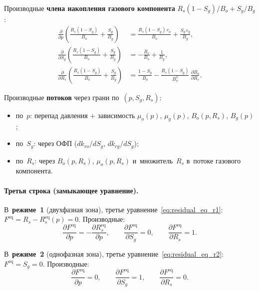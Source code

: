 \documentclass[12pt,a4paper]{article}
\begin{document}
Производные \textbf{члена накопления газового компонента}
$R_s(1-S_g)/B_o + S_g/B_g$:
\begin{align}
  \frac{\partial}{\partial p}\!\left(\frac{R_s(1\!-\!S_g)}{B_o}
    \!+\! \frac{S_g}{B_g}\right)
    &= \frac{R_s(1\!-\!S_g)\,c_o}{B_o}
       + \frac{S_g\,c_g}{B_g},
     \label{eq:daccum_gas_dp} \\[4pt]
  \frac{\partial}{\partial S_g}\!\left(\frac{R_s(1\!-\!S_g)}{B_o}
    \!+\! \frac{S_g}{B_g}\right)
    &= -\frac{R_s}{B_o} + \frac{1}{B_g},
     \label{eq:daccum_gas_dSg} \\[4pt]
  \frac{\partial}{\partial R_s}\!\left(\frac{R_s(1\!-\!S_g)}{B_o}
    \!+\! \frac{S_g}{B_g}\right)
    &= \frac{1\!-\!S_g}{B_o}
       - \frac{R_s(1\!-\!S_g)}{B_o^2}\,\frac{\partial B_o}{\partial R_s}.
     \label{eq:daccum_gas_dRs}
\end{align}

Производные \textbf{потоков} через грани по~$(p, S_g, R_s)$:
\begin{itemize}[nosep]
  \item по~$p$: перепад давления $+$ зависимость $\mu_o(p)$,
        $\mu_g(p)$, $B_o(p, R_s)$, $B_g(p)$;
  \item по~$S_g$: через ОФП ($dk_{ro}/dS_g$, $dk_{rg}/dS_g$);
  \item по~$R_s$: через $B_o(p, R_s)$, $\mu_o(p, R_s)$
        и~множитель~$R_s$ в~потоке газового компонента.
\end{itemize}


\paragraph{Третья строка (замыкающее уравнение).}

В~\textbf{режиме~1} (двухфазная зона), третье
уравнение~\eqref{eq:residual_eq_r1}:
$F^{\text{eq}} = R_s - R_s^{\text{eq}}(p) = 0$. Производные:
\begin{equation}\label{eq:deq_r1}
  \frac{\partial F^{\text{eq}}}{\partial p} =
    -\frac{\partial R_s^{\text{eq}}}{\partial p},
  \qquad
  \frac{\partial F^{\text{eq}}}{\partial S_g} = 0,
  \qquad
  \frac{\partial F^{\text{eq}}}{\partial R_s} = 1.
\end{equation}

В~\textbf{режиме~2} (однофазная зона), третье
уравнение~\eqref{eq:residual_eq_r2}:
$F^{\text{eq}} = S_g = 0$. Производные:
\begin{equation}\label{eq:deq_r2}
  \frac{\partial F^{\text{eq}}}{\partial p} = 0,
  \qquad
  \frac{\partial F^{\text{eq}}}{\partial S_g} = 1,
  \qquad
  \frac{\partial F^{\text{eq}}}{\partial R_s} = 0.
\end{equation}
\end{document}
